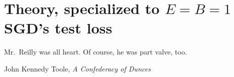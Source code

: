 \documentclass[openany, notitlepage, justified]{tufte-book}
\theoremstyle{plain}
\theoremstyle{definition}
\begin{document}

\chapter{Theory, specialized to $E=B=1$ SGD's test loss} \label{sect:calculus}

    \renewcommand{\textflush}{flushright}
    \setlength{\epigraphwidth}{0.65\columnwidth}
    \epigraph{
        Mr.\ Reilly was all heart.  Of course, he was part valve, too.
    }{John Kennedy Toole, \emph{A Confederacy of Dunces}}
\end{document}
